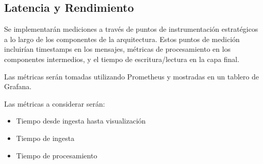 \subsection{Latencia y Rendimiento}

Se implementarán mediciones a través de puntos de instrumentación estratégicos a lo largo de los componentes de la arquitectura.  
Estos puntos de medición incluirían timestamps en los mensajes, métricas de procesamiento en los componentes intermedios, y el tiempo de escritura/lectura en la capa final. 

Las métricas serán tomadas utilizando Prometheus y mostradas en un tablero de Grafana.

Las métricas a considerar serán:
\begin{itemize}
    \item Tiempo desde ingesta hasta visualización
    \item Tiempo de ingesta
    \item Tiempo de procesamiento
\end{itemize}